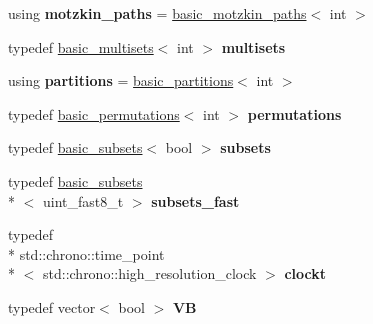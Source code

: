 \begin{DoxyCompactItemize}
\item 
\hypertarget{namespacedscr_a9a5f562c0e10ba4a56a9b415789517f7}{using {\bfseries motzkin\-\_\-paths} = \hyperlink{classdscr_1_1basic__motzkin__paths}{basic\-\_\-motzkin\-\_\-paths}$<$ int $>$}\label{namespacedscr_a9a5f562c0e10ba4a56a9b415789517f7}

\item 
\hypertarget{namespacedscr_a9fb85b7fa706721fa7ad18509bf1564d}{typedef \hyperlink{classdscr_1_1basic__multisets}{basic\-\_\-multisets}$<$ int $>$ {\bfseries multisets}}\label{namespacedscr_a9fb85b7fa706721fa7ad18509bf1564d}

\item 
\hypertarget{namespacedscr_a31f6bc4c39ebc17b98f20c4eeaede0a3}{using {\bfseries partitions} = \hyperlink{classdscr_1_1basic__partitions}{basic\-\_\-partitions}$<$ int $>$}\label{namespacedscr_a31f6bc4c39ebc17b98f20c4eeaede0a3}

\item 
\hypertarget{namespacedscr_a9e61754e725e663b0f40bbfff8bafcfc}{typedef \hyperlink{classdscr_1_1basic__permutations}{basic\-\_\-permutations}$<$ int $>$ {\bfseries permutations}}\label{namespacedscr_a9e61754e725e663b0f40bbfff8bafcfc}

\item 
\hypertarget{namespacedscr_aa55af7426ea06b63ae05871bda088651}{typedef \hyperlink{classdscr_1_1basic__subsets}{basic\-\_\-subsets}$<$ bool $>$ {\bfseries subsets}}\label{namespacedscr_aa55af7426ea06b63ae05871bda088651}

\item 
\hypertarget{namespacedscr_ab2f40020ed8d272641a762cc88e5f6d6}{typedef \hyperlink{classdscr_1_1basic__subsets}{basic\-\_\-subsets}\\*
$<$ uint\-\_\-fast8\-\_\-t $>$ {\bfseries subsets\-\_\-fast}}\label{namespacedscr_ab2f40020ed8d272641a762cc88e5f6d6}

\item 
\hypertarget{namespacedscr_a1b3465ad982bf9626244c6068ae9e2e8}{typedef \\*
std\-::chrono\-::time\-\_\-point\\*
$<$ std\-::chrono\-::high\-\_\-resolution\-\_\-clock $>$ {\bfseries clockt}}\label{namespacedscr_a1b3465ad982bf9626244c6068ae9e2e8}

\item 
\hypertarget{namespacedscr_aced4011fd0d63ce7e7ce407e22ee71bd}{typedef vector$<$ bool $>$ {\bfseries V\-B}}\label{namespacedscr_aced4011fd0d63ce7e7ce407e22ee71bd}


\end{DoxyCompactItemize}
